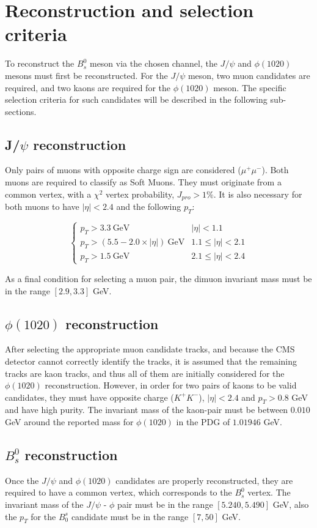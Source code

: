 \section{Reconstruction and selection criteria}%
To reconstruct the $B^0_s$ meson via the chosen channel, the $J/\psi$ and $\phi (1020)$ mesons must first be reconstructed. For the $J/\psi$ meson, two muon candidates are required, and two kaons are required for the $\phi (1020)$ meson. The specific selection criteria for such candidates will be described in the following sub-sections.
\subsection{J/$\psi$ reconstruction}

Only pairs of muons with opposite charge sign are considered ($\mu^{+}\mu^{-}$). Both muons are required to classify as Soft Muons. They must originate from a common vertex, with a  $\chi^2$ vertex probability, $J_{pro} > 1\%$. It is also necessary for both muons to have $|\eta| < 2.4$ and the following $p_T$:

\[ \begin{cases} 
	p_T > 3.3 \ \text{GeV} & |\eta| < 1.1 \\
	p_T > \left(5.5 - 2.0 \times |\eta|\right) \ \text{GeV} & 1.1 \leq |\eta| < 2.1 \\
	p_T > 1.5 \ \text{GeV} & 2.1 \leq |\eta| < 2.4 
\end{cases}
\] 

As a final condition for selecting a muon pair, the dimuon invariant mass must be in the range $[2.9, 3.3]$ GeV.
\subsection{$\phi(1020)$ reconstruction}
After selecting the appropriate muon candidate tracks, and because the CMS detector cannot correctly identify the tracks, it is assumed that the remaining tracks are kaon tracks, and thus all of them are initially considered for the $\phi(1020)$ reconstruction. However, in order for two pairs of kaons to be valid candidates, they must have opposite charge ($K^{+}K^{-}$), $|\eta| < 2.4$ and $p_T > 0.8$ GeV and have high purity. The invariant mass of the kaon-pair must be between $0.010$ GeV around the reported mass for $\phi(1020)$ in the PDG of $1.01946$ GeV.
\subsection{$B_s^0$ reconstruction}
Once the $J/\psi$ and $\phi(1020)$ candidates are properly reconstructed, they are required to have a common vertex, which corresponds to the $B_s^0$ vertex. The invariant mass of the $J/\psi$ - $\phi$ pair must be in the range $[5.240, 5.490]$ GeV, also the $p_T$ for the $B_0^s$ candidate must be in the range $[7, 50]$ GeV. 

